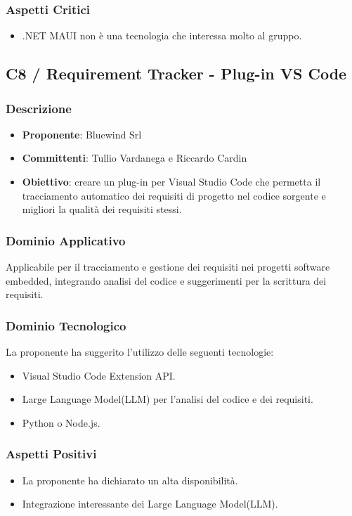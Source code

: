 \documentclass[a4paper, 12pt]{article}
\begin{document}
\subsubsection{Aspetti Critici}
\begin{itemize}
    \item .NET MAUI non è una tecnologia che interessa molto al gruppo.
\end{itemize}

\subsection{C8 / Requirement Tracker - Plug-in VS Code}
\subsubsection{Descrizione}
\begin{itemize}
    \item \textbf{Proponente}: Bluewind Srl
    \item \textbf{Committenti}: Tullio Vardanega e Riccardo Cardin
    \item \textbf{Obiettivo}: creare un plug-in per Visual Studio Code che permetta il tracciamento automatico dei requisiti di progetto nel codice sorgente e migliori la qualità dei requisiti stessi.
\end{itemize}

\subsubsection{Dominio Applicativo}
Applicabile per il tracciamento e gestione dei requisiti nei progetti software embedded, integrando analisi del codice e suggerimenti per la scrittura dei requisiti.

\subsubsection{Dominio Tecnologico}
La proponente ha suggerito l’utilizzo delle seguenti tecnologie:
\begin{itemize}
    \item Visual Studio Code Extension API.
    \item Large Language Model(LLM) per l'analisi del codice e dei requisiti.
    \item Python o Node.js.
\end{itemize}

\subsubsection{Aspetti Positivi}
\begin{itemize}
    \item La proponente ha dichiarato un alta disponibilità.
    \item Integrazione interessante dei Large Language Model(LLM).
\end{itemize}
\end{document}
